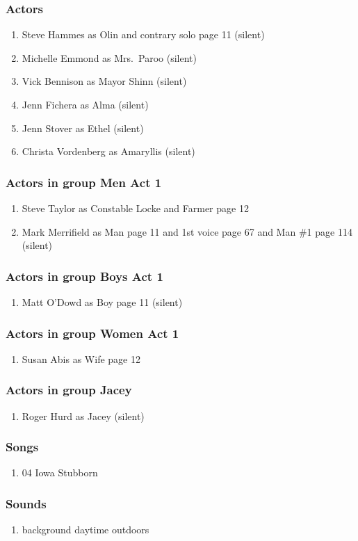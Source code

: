 \subsubsection{Actors}
\begin{enumerate}
\item Steve Hammes as Olin and contrary solo page 11 (silent)
\item Michelle Emmond as Mrs.~Paroo (silent)
\item Vick Bennison as Mayor Shinn (silent)
\item Jenn Fichera as Alma (silent)
\item Jenn Stover as Ethel (silent)
\item Christa Vordenberg as Amaryllis (silent)
\end{enumerate}
\subsubsection{Actors in group Men Act 1}
\begin{enumerate}
\item Steve Taylor as Constable Locke and Farmer page 12
\item Mark Merrifield as Man page 11 and 1st voice page 67 and Man \#1 page 114 (silent)
\end{enumerate}
\subsubsection{Actors in group Boys Act 1}
\begin{enumerate}
\item Matt O'Dowd as Boy page 11 (silent)
\end{enumerate}
\subsubsection{Actors in group Women Act 1}
\begin{enumerate}
\item Susan Abis as Wife page 12
\end{enumerate}
\subsubsection{Actors in group Jacey}
\begin{enumerate}
\item Roger Hurd as Jacey (silent)
\end{enumerate}

\subsubsection{Songs}
\begin{enumerate}
\item 04 Iowa Stubborn
\end{enumerate}\subsubsection{Sounds}
\begin{enumerate}
\item background daytime outdoors
\end{enumerate}
